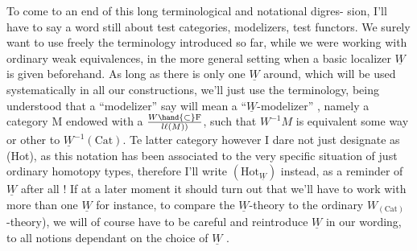 
To come to an end of this long terminological and notational digres-%
sion,  I'll have to say a word still about test categories,  modelizers,
test functors.  We surely want to use freely the terminology introduced
so far,  while we were working with ordinary weak equivalences,  in the
more general setting when a basic localizer $\underline{W}$ is given beforehand.  As
long as there is only one $\underline{W}$ around,  which will be used systematically in
all our constructions,  we'll just use the  terminology,  being understood
that a ``modelizer'' say will mean a ``$\underline{W}$-modelizer'' ,  namely a category
M endowed with a  $W\hand{\subset} \mathrm{F}\over{l}{\ell}(M))$,  such that $W^{-1}M$ is equivalent some way or
other to $\underline{W}^{-1}(\mathrm{Cat})$.  Te latter category however I dare not just designate
as (Hot),  as this notation has been associated to the very specific
situation of just ordinary homotopy types,  therefore I'll  write
$(\mathrm{Hot}_{\underline{W}})$  instead,  as a reminder of $\underline{W}$ after all !  If at a later moment
it should turn out that we'll have to work with more than one $\underline{W}$  \unsure{\hand{(}|\hand{\ensuremath{\leftarrow}}} for
instance,  to compare the $\underline{W}$-theory to the ordinary $W_{(\mathrm{Cat})}$ -theory),  we
will of course have to be careful and reintroduce $\underline{W}$  in our
wording,  to  all notions dependant on the choice of $\underline{W}$ .



